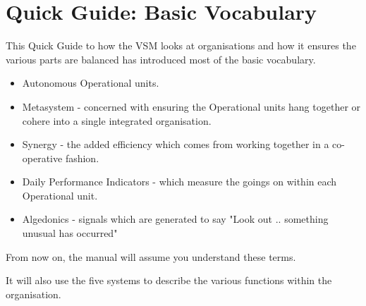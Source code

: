 \section*{Quick Guide: Basic Vocabulary}
This Quick Guide to how the VSM looks at organisations and how it ensures the various parts are balanced has introduced most of the basic vocabulary.

\begin{itemize}
  \item Autonomous Operational units.

  \item Metasystem - concerned with ensuring the Operational units hang together or cohere into a single integrated organisation.

  \item Synergy - the added efficiency which comes from working together in a co-operative fashion.

  \item Daily Performance Indicators - which measure the goings on within each Operational unit.

  \item Algedonics - signals which are generated to say "Look out .. something unusual has occurred"

\end{itemize}

From now on, the manual will assume you understand these terms.

It will also use the five systems to describe the various functions within the organisation.